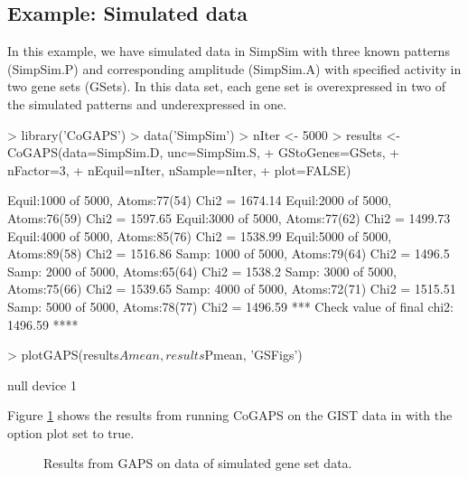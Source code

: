 \documentclass{report}
\begin{document}
\subsection{Example: Simulated data}

\par In this example, we have simulated data in SimpSim with three known patterns (SimpSim.P) and corresponding amplitude (SimpSim.A) with specified activity in two gene sets (GSets).  In this data set, each gene set is overexpressed in two of the simulated patterns and underexpressed in one.

\begin{Schunk}
\begin{Sinput}
> library('CoGAPS')
> data('SimpSim')
> nIter <- 5000
> results <- CoGAPS(data=SimpSim.D, unc=SimpSim.S,
+ 		  GStoGenes=GSets,
+                   nFactor=3,
+                   nEquil=nIter, nSample=nIter,
+                   plot=FALSE)
\end{Sinput}
\begin{Soutput}
Equil:1000 of 5000, Atoms:77(54)  Chi2 = 1674.14
Equil:2000 of 5000, Atoms:76(59)  Chi2 = 1597.65
Equil:3000 of 5000, Atoms:77(62)  Chi2 = 1499.73
Equil:4000 of 5000, Atoms:85(76)  Chi2 = 1538.99
Equil:5000 of 5000, Atoms:89(58)  Chi2 = 1516.86
Samp: 1000 of 5000, Atoms:79(64)  Chi2 = 1496.5
Samp: 2000 of 5000, Atoms:65(64)  Chi2 = 1538.2
Samp: 3000 of 5000, Atoms:75(66)  Chi2 = 1539.65
Samp: 4000 of 5000, Atoms:72(71)  Chi2 = 1515.51
Samp: 5000 of 5000, Atoms:78(77)  Chi2 = 1496.59
 *** Check value of final chi2: 1496.59 **** 
\end{Soutput}
\begin{Sinput}
> plotGAPS(results$Amean, results$Pmean, 'GSFigs')
\end{Sinput}
\begin{Soutput}
null device 
          1 
\end{Soutput}
\end{Schunk}

Figure \ref{fig:GS2} shows the results from running CoGAPS on the GIST data in \cite{Ochs2009} with the option plot set to true.
\begin{figure}[ht]
\begin{center}
\end{center}
\caption{Results from GAPS on data of simulated gene set data.}
\label{fig:GS2}
\end{figure}
\end{document}

